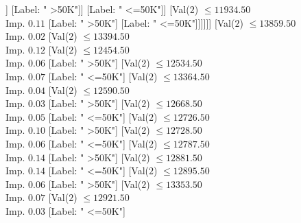 \documentclass[margin=10pt]{standalone}
\begin{document}
\begin{forest}
																		[Val($2$) $ \leq 11908.50$ \\ Imp. $0.03$
																			[Val($2$) $ \leq 11484.50$ \\ Imp. $0.22$
																				[Val($2$) $ \leq 11424.50$ \\ Imp. $0.20$
																					[Val($2$) $ \leq 11291.50$ \\ Imp. $0.06$
																						[Label: " >50K"]
																						[Label: " <=50K"]]
																					[Label: " >50K"]]
																				[Label: " <=50K"]]
																			[Val($2$) $ \leq 11934.50$ \\ Imp. $0.11$
																				[Label: " >50K"]
																				[Label: " <=50K"]]]]]]
															[Val($2$) $ \leq 13859.50$ \\ Imp. $0.02$
																[Val($2$) $ \leq 13394.50$ \\ Imp. $0.12$
																	[Val($2$) $ \leq 12454.50$ \\ Imp. $0.06$
																		[Label: " >50K"]
																		[Val($2$) $ \leq 12534.50$ \\ Imp. $0.07$
																			[Label: " <=50K"]
																			[Val($2$) $ \leq 13364.50$ \\ Imp. $0.04$
																				[Val($2$) $ \leq 12590.50$ \\ Imp. $0.03$
																					[Label: " >50K"]
																					[Val($2$) $ \leq 12668.50$ \\ Imp. $0.05$
																						[Label: " <=50K"]
																						[Val($2$) $ \leq 12726.50$ \\ Imp. $0.10$
																							[Label: " >50K"]
																							[Val($2$) $ \leq 12728.50$ \\ Imp. $0.06$
																								[Label: " <=50K"]
																								[Val($2$) $ \leq 12787.50$ \\ Imp. $0.14$
																									[Label: " >50K"]
																									[Val($2$) $ \leq 12881.50$ \\ Imp. $0.14$
																										[Label: " <=50K"]
																										[Val($2$) $ \leq 12895.50$ \\ Imp. $0.06$
																											[Label: " >50K"]
																											[Val($2$) $ \leq 13353.50$ \\ Imp. $0.07$
																												[Val($2$) $ \leq 12921.50$ \\ Imp. $0.03$
																													[Label: " <=50K"]

\end{forest}
\end{document}

